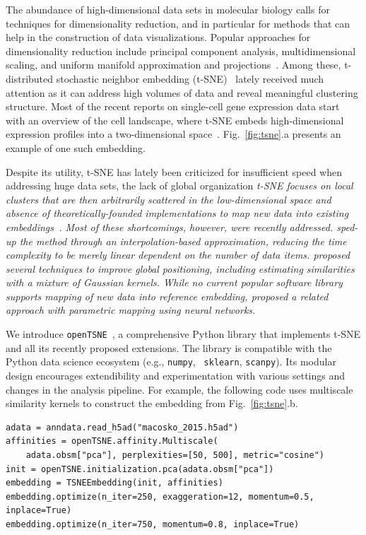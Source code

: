 \documentclass{bioinfo}
\newcommand{\opentsne}[0]{{\tt openTSNE}\ }
\begin{document}
The abundance of high-dimensional data sets in molecular biology calls for
techniques for dimensionality reduction, and in particular for methods that can
help in the construction of data visualizations. Popular approaches for
dimensionality reduction include principal component analysis, multidimensional
scaling, and uniform manifold approximation and projections~\citep{umap}. Among
these, t-distributed stochastic neighbor embedding
(t-SNE)~\citep{tsne} lately received much attention as it can
address high volumes of data and reveal meaningful clustering structure. Most
of the recent reports on single-cell gene expression data start with an
overview of the cell landscape, where t-SNE embeds high-dimensional expression
profiles into a two-dimensional space~\citep{Macosko2015, Shekhar2016}.
Fig.~\ref{fig:tsne}.a presents an example of one such embedding.

Despite its utility, t-SNE has lately been criticized for insufficient speed
when addressing huge data sets, the lack of global organization \em t-SNE
focuses on local clusters that are then arbitrarily scattered in the
low-dimensional space \em and absence of theoretically-founded implementations to
map new data into existing embeddings~\citep{ding2018interpretable,becht2019dimensionality}. Most of these shortcomings, however, were
recently addressed.
\citet{fi_tsne} sped-up the method through an interpolation-based
approximation, reducing the time complexity to be merely linear dependent on the number of data items. \citet{art_of_using_tsne} proposed
several techniques to improve global positioning, including estimating similarities with a mixture of
Gaussian kernels. While no current popular
software library supports mapping of new data into reference embedding,
\citet{parametric_tsne} proposed a related approach with parametric mapping
using neural networks.

We introduce \opentsne, a comprehensive Python library that
implements t-SNE and all its recently proposed extensions. The library is
compatible with the Python data science ecosystem (e.g., {\tt numpy}, {\tt
sklearn}, {\tt scanpy}). Its modular design encourages extendibility and
experimentation with various settings and changes in the analysis pipeline. For
example, the following code uses multiscale similarity kernels to construct the
embedding from Fig.~\ref{fig:tsne}.b.

\begin{lstlisting}
adata = anndata.read_h5ad("macosko_2015.h5ad")
affinities = openTSNE.affinity.Multiscale(
	adata.obsm["pca"], perplexities=[50, 500], metric="cosine")
init = openTSNE.initialization.pca(adata.obsm["pca"])
embedding = TSNEEmbedding(init, affinities)
embedding.optimize(n_iter=250, exaggeration=12, momentum=0.5, inplace=True)
embedding.optimize(n_iter=750, momentum=0.8, inplace=True)
\end{lstlisting}
\end{document}
